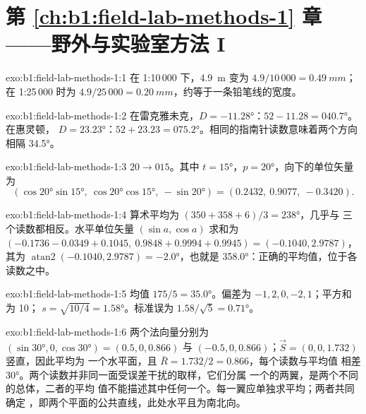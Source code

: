 \section*{第 \ref{ch:b1:field-lab-methods-1} 章——野外与实验室方法 I}

\begin{solution}{exo:b1:field-lab-methods-1:1}
在 1:10\,000 下，\qty{4.9}{m} 变为 $4.9/10\,000 = \qty{0.49}{mm}$；
在 1:25\,000 时为 $4.9/25\,000 = \qty{0.20}{mm}$，约等于一条铅笔线的宽度。
\end{solution}

\begin{solution}{exo:b1:field-lab-methods-1:2}
在雷克雅未克，$D = \ang{-11.28}$：$52 - 11.28 = \ang{040.7}$。在惠灵顿，
$D = \ang{+23.23}$：$52 + 23.23 = \ang{075.2}$。相同的指南针读数意味着两个方向
相隔 \ang{34.5}。
\end{solution}

\begin{solution}{exo:b1:field-lab-methods-1:3}
$20\to015$。其中 $t = \ang{15}$，$p = \ang{20}$，向下的单位矢量为
\[
  (\cos\ang{20}\sin\ang{15},\ \cos\ang{20}\cos\ang{15},\ -\sin\ang{20}) =
  (0.2432,\ 0.9077,\ -0.3420).
\]
\end{solution}

\begin{solution}{exo:b1:field-lab-methods-1:4}
算术平均为 $(350 + 358 + 6)/3 = \ang{238}$，几乎与
三个读数都相反。水平单位矢量 $(\sin a, \cos a)$ 求和为
$(-0.1736 - 0.0349 + 0.1045,\ 0.9848 + 0.9994 + 0.9945) = (-0.1040, 2.9787)$，
其为 $\operatorname{atan2}(-0.1040, 2.9787) = \ang{-2.0}$，也就是
\ang{358.0}：正确的平均值，位于各读数之中。
\end{solution}

\begin{solution}{exo:b1:field-lab-methods-1:5}
均值 $175/5 = \ang{35.0}$。偏差为 $-1, 2, 0, -2, 1$；平方和为 10；
$s = \sqrt{10/4} = \ang{1.58}$。标准误为 $1.58/\sqrt5 = \ang{0.71}$。
\end{solution}

\begin{solution}{exo:b1:field-lab-methods-1:6}
两个法向量分别为 $(\sin\ang{30}, 0, \cos\ang{30}) = (0.5, 0, 0.866)$ 与
$(-0.5, 0, 0.866)$；$\vec S = (0, 0, 1.732)$ 竖直，因此平均为
一个水平面，且 $\bar R = 1.732/2 = 0.866$，每个读数与平均值
相差 \ang{30}。两个读数并非同一面受误差干扰的取样，它们分属
一个的两翼，是两个不同的总体，二者的平均
值不能描述其中任何一个。每一翼应单独求平均；两者共同确定
，即两个平面的公共直线，此处水平且为南北向。
\end{solution}

